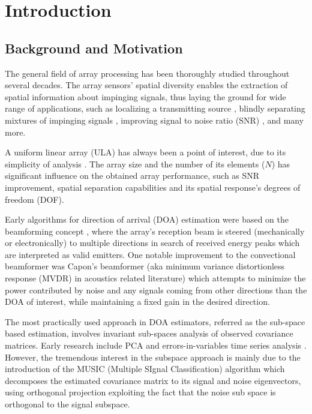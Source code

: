 \chapter{Introduction}
\label{chap:intro}
\section{Background and Motivation}
The general field of array processing has been thoroughly studied throughout several decades.
The array sensors' spatial diversity enables the extraction of spatial information about impinging signals, thus laying the ground for wide range of applications, such as localizing a transmitting source \cite{skolnik2008radar,long2019}, blindly separating mixtures of impinging signals \cite{comon1994independent}, improving signal to noise ratio (SNR) \cite{verdu1998multiuser}, and many more. 
\par A uniform linear array (ULA) has always been a point of interest, due to its simplicity of analysis \cite{van2004optimum,benesty2018}. 
The array size and the number of its elements ($N$) has significant influence on the obtained array performance, such as SNR improvement, spatial separation capabilities and its spatial response's degrees of freedom (DOF).
\par Early algorithms for direction of arrival (DOA) estimation were based on the beamforming concept \cite{krim1996two}, where the array's reception beam is steered (mechanically or electronically) to multiple directions in search of received energy peaks which are interpreted as valid emitters.
One notable improvement to the convectional beamformer \cite{van2004optimum} was Capon's beamformer  (aka minimum variance distortionless response (MVDR) in acoustics related literature) which attempts to minimize the power contributed by noise and any signals coming from other directions than the DOA of interest, while maintaining a fixed gain
in the desired direction.
\par The most practically used approach in DOA estimators, referred as the sub-space based estimation, involves invariant sub-spaces analysis of observed covariance matrices.
Early research include PCA and errors-in-variables time series analysis \cite{krim1996two}.   
However, the tremendous interest in the subspace approach is mainly due to the introduction of the
MUSIC (Multiple SIgnal Classification) algorithm \cite{schmidt1986multiple} which decomposes the estimated covariance matrix to its signal and noise eigenvectors, using orthogonal projection exploiting the fact that the noise sub space is orthogonal to the signal subspace.

